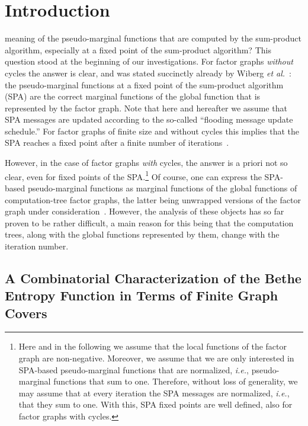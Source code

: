 \documentclass[journal, twocolumn]{IEEEtran}
\newcommand{\etal}{\emph{et al.}}
\newcommand{\ie}{\emph{i.e.}}
\newcommand{\?}{\mathrm{?}}
\begin{document}
\section{Introduction}
\label{sec:introduction:1}



 meaning of the pseudo-marginal functions that are
computed by the sum-product algorithm, especially at a fixed point of the
sum-product algorithm? This question stood at the beginning of our
investigations. For factor graphs \emph{without} cycles the answer is clear,
and was stated succinctly already by Wiberg
\etal~\cite{Wiberg:Loeliger:Koetter:95, Wiberg:96}: the pseudo-marginal
functions at a fixed point of the sum-product algorithm (SPA) are the correct
marginal functions of the global function that is represented by the factor
graph. Note that here and hereafter we assume that SPA messages are updated
according to the so-called ``flooding message update schedule.'' For factor
graphs of finite size and without cycles this implies that the SPA reaches a
fixed point after a finite number of
iterations~\cite{Wiberg:Loeliger:Koetter:95, Wiberg:96}.

However, in the case of factor graphs \emph{with} cycles, the answer is a
priori not so clear, even for fixed points of the
SPA.\footnote{\label{footnote:assumptions:on:nfg:1} Here and in the following
  we assume that the local functions of the factor graph are
  non-negative. Moreover, we assume that we are only interested in SPA-based
  pseudo-marginal functions that are normalized, \ie, pseudo-marginal
  functions that sum to one. Therefore, without loss of generality, we may
  assume that at every iteration the SPA messages are normalized, \ie, that
  they sum to one. With this, SPA fixed points are well defined, also for
  factor graphs with cycles.} Of course, one can express the SPA-based
pseudo-marginal functions as marginal functions of the global functions of
computation-tree factor graphs, the latter being unwrapped versions of the
factor graph under consideration~\cite{Wiberg:Loeliger:Koetter:95,
  Wiberg:96}. However, the analysis of these objects has so far proven to be
rather difficult, a main reason for this being that the computation trees,
along with the global functions represented by them, change with the iteration
number.





\subsection{A Combinatorial Characterization of the Bethe Entropy Function in
  Terms of Finite Graph Covers}
\end{document}
